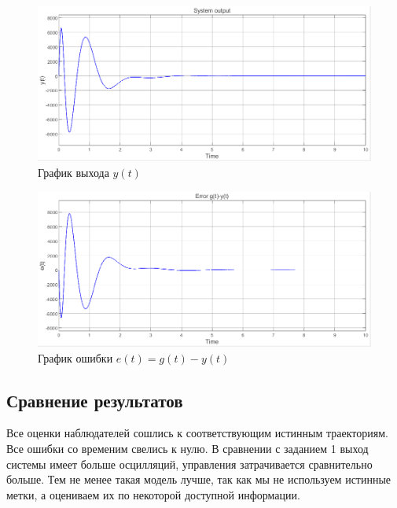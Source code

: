 \documentclass[a4paper, 12pt]{article}
\begin{document}
    \begin{figure}[H]
        \centering
        \includegraphics[scale=0.6]{2task_y.png}
        \captionsetup{skip=0pt}
        \caption{График выхода $y(t)$}
        \label{fig:2task_y}
    \end{figure}
    \begin{figure}[H]
        \centering
        \includegraphics[scale=0.6]{2task_ey.png}
        \captionsetup{skip=0pt}
        \caption{График ошибки $e(t)=g(t)-y(t)$}
        \label{fig:2task_ey}
    \end{figure}


    \subsection{Сравнение результатов}
    Все оценки наблюдателей сошлись к соответствующим истинным траекториям.
    Все ошибки со временим свелись к нулю. В сравнении с заданием 1 выход системы
    имеет больше осцилляций, управления затрачивается сравнительно больше.
    Тем не менее такая модель лучше, так как мы не используем истинные метки,
    а оцениваем их по некоторой доступной информации.
\end{document}
